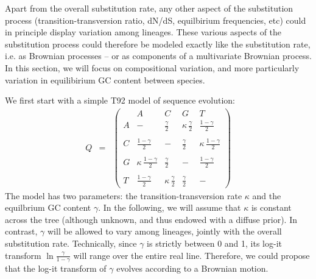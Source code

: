 Apart from the overall substitution rate, any other aspect of the substitution process (transition-transversion ratio, dN/dS, equilbirium frequencies, etc) could in principle display variation among lineages. These various aspects of the substitution  process could therefore be modeled exactly like the substitution rate, i.e. as Brownian processes -- or as components of a multivariate Brownian process.
In this section, we will focus on compositional variation, and more particularly variation in equilibirium GC content between species.

We first start with a simple T92 model of sequence evolution:
\begin{eqnarray*}
Q &=& 
\left( \begin{array}{r|rrrrr}
&A&C&G&T\\
\hline
A&- &  \frac{\gamma}{2}  & \kappa \, \frac{\gamma}{2} &  \frac{1 - \gamma}{2} \\
\\
C& \frac{1 - \gamma}{2} & - & \frac{\gamma}{2} & \kappa \, \frac{1 - \gamma}{2}  \\
\\
G&\kappa \, \frac{1 - \gamma}{2}  &  \frac{\gamma}{2}  & - & \frac{1 - \gamma}{2}  \\
\\
T& \frac{1 - \gamma}{2} & \kappa \, \frac{\gamma}{2}  &  \frac{\gamma}{2}  & -
\end{array} \right)
\end{eqnarray*}
The model has two parameters: the transition-transversion rate $\kappa$ and the equilbrium GC content $\gamma$. In the following, we will assume that $\kappa$ is constant across the tree (although unknown, and thus endowed with a diffuse prior). In contrast, $\gamma$ will be allowed to vary among lineages, jointly with the overall substitution rate.
Technically, since $\gamma$ is strictly between 0 and 1, its log-it transform $\ln \frac{\gamma}{1 - \gamma}$ will range over the entire real line. Therefore, we could propose that the log-it transform of $\gamma$ evolves according to a Brownian motion.

